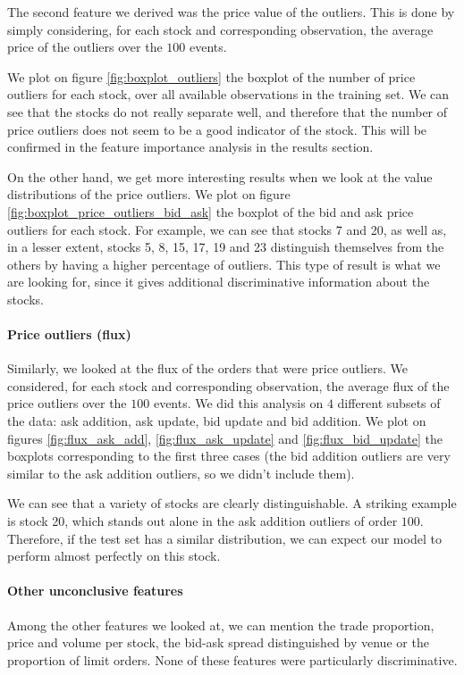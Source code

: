 \documentclass[switch, 11pt]{article}
\begin{document}
\begin{multicols}{2}
    The second feature we derived was the price value of the outliers. This is done by simply considering, for each stock and corresponding observation, the average price of the outliers over the $100$ events.

    We plot on figure \ref{fig:boxplot_outliers} the boxplot of the number of price outliers for each stock, over all available observations in the training set. We can see that the stocks do not really separate well, and therefore that the number of price outliers does not seem to be a good indicator of the stock. This will be confirmed in the feature importance analysis in the results section.

    On the other hand, we get more interesting results when we look at the value distributions of the price outliers. We plot on figure \ref{fig:boxplot_price_outliers_bid_ask} the boxplot of the bid and ask price outliers for each stock. For example, we can see that stocks 7 and 20, as well as, in a lesser extent, stocks 5, 8, 15, 17, 19 and 23 distinguish themselves from the others by having a higher percentage of outliers. This type of result is what we are looking for, since it gives additional discriminative information about the stocks.

    \paragraph{Price outliers (flux)}
    Similarly, we looked at the flux of the orders that were price outliers. We considered, for each stock and corresponding observation, the average flux of the price outliers over the $100$ events. We did this analysis on $4$ different subsets of the data: ask addition, ask update, bid update and bid addition.
    We plot on figures \ref{fig:flux_ask_add}, \ref{fig:flux_ask_update} and \ref{fig:flux_bid_update} the boxplots corresponding to the first three cases (the bid addition outliers are very similar to the ask addition outliers, so we didn't include them).

    We can see that a variety of stocks are clearly distinguishable. A striking example is stock 20, which stands out alone in the ask addition outliers of order $100$. Therefore, if the test set has a similar distribution, we can expect our model to perform almost perfectly on this stock.

    \paragraph{Other unconclusive features} Among the other features we looked at, we can mention the trade proportion, price and volume per stock, the bid-ask spread distinguished by venue or the proportion of limit orders. None of these features were particularly discriminative.

\end{multicols}
\end{document}

